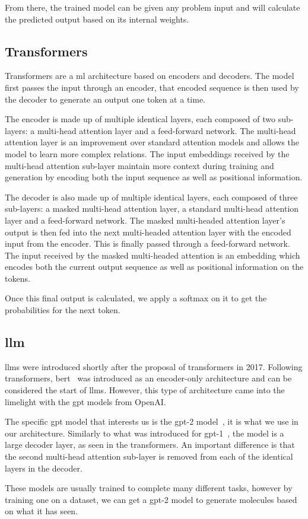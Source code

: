 \documentclass[../Document.tex]{subfiles}
\begin{document}
From there, the trained model can be given any problem input and will calculate the predicted output based on its internal weights.


\subsection{Transformers}
Transformers\cite{vaswani2017attention} are a \gls{ml} architecture based on encoders and decoders. The model first passes the input through an encoder, that encoded sequence is then used by the decoder to generate an output one token at a time.

The encoder is made up of multiple identical layers, each composed of two sub-layers: a multi-head attention layer and a feed-forward network.
The multi-head attention layer is an improvement over standard attention models and allows the model to learn more complex relations.
The input embeddings received by the multi-head attention sub-layer maintain more context during training and generation by encoding both the input sequence as well as positional information.

The decoder is also made up of multiple identical layers, each composed of three sub-layers: a masked multi-head attention layer, a standard multi-head attention layer and a feed-forward network.
The masked multi-headed attention layer's output is then fed into the next multi-headed attention layer with the encoded input from the encoder. This is finally passed through a feed-forward network.
The input received by the masked multi-headed attention is an embedding which encodes both the current output sequence as well as positional information on the tokens.

Once this final output is calculated, we apply a softmax on it to get the probabilities for the next token.  


\subsection{\acrlong{llm}}
\glspl{llm} were introduced shortly after the proposal of transformers in 2017. Following transformers, \gls{bert}~\cite{devlin2019bert} was introduced as an encoder-only architecture and can be considered the start of \glspl{llm}. However, this type of architecture came into the limelight with the \gls{gpt} models from OpenAI.

The specific \gls{gpt} model that interests us is the \gls{gpt}-2 model~\cite{radford2019language}, it is what we use in our architecture. Similarly to what was introduced for \gls{gpt}-1~\cite{radford2018improving}, the model is a large decoder layer, as seen in the transformers.
An important difference is that the second multi-head attention sub-layer is removed from each of the identical layers in the decoder.

These models are usually trained to complete many different tasks, however by training one on a \smiles dataset, we can get a \gls{gpt}-2 model to generate molecules based on what it has seen.
\end{document}
